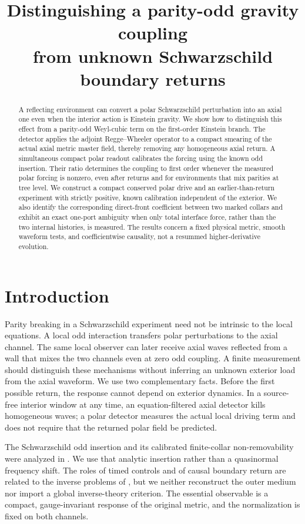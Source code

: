 \documentclass[11pt]{article}
\title{Distinguishing a parity-odd gravity coupling\\from unknown Schwarzschild boundary returns}
\author{}
\date{}
\begin{document}
\maketitle
\begin{abstract}
A reflecting environment can convert a polar Schwarzschild perturbation into an axial one even when the interior action is Einstein gravity. We show how to distinguish this effect from a parity-odd Weyl-cubic term on the first-order Einstein branch. The detector applies the adjoint Regge--Wheeler operator to a compact smearing of the actual axial metric master field, thereby removing any homogeneous axial return. A simultaneous compact polar readout calibrates the forcing using the known odd insertion. Their ratio determines the coupling to first order whenever the measured polar forcing is nonzero, even after returns and for environments that mix parities at tree level. We construct a compact conserved polar drive and an earlier-than-return experiment with strictly positive, known calibration independent of the exterior. We also identify the corresponding direct-front coefficient between two marked collars and exhibit an exact one-port ambiguity when only total interface force, rather than the two internal histories, is measured. The results concern a fixed physical metric, smooth waveform tests, and coefficientwise causality, not a resummed higher-derivative evolution.
\end{abstract}

\section{Introduction}

Parity breaking in a Schwarzschild experiment need not be intrinsic to the local equations. A local odd interaction transfers polar perturbations to the axial channel. The same local observer can later receive axial waves reflected from a wall that mixes the two channels even at zero odd coupling. A finite measurement should distinguish these mechanisms without inferring an unknown exterior load from the axial waveform. We use two complementary facts. Before the first possible return, the response cannot depend on exterior dynamics. In a source-free interior window at any time, an equation-filtered axial detector kills homogeneous waves; a polar detector measures the actual local driving term and does not require that the returned polar field be predicted.

The Schwarzschild odd insertion and its calibrated finite-collar non-removability were analyzed in \cite{P27}. We use that analytic insertion rather than a quasinormal frequency shift. The roles of timed controls and of causal boundary return are related to the inverse problems of \cite{P33,P44}, but we neither reconstruct the outer medium nor import a global inverse-theory criterion. The essential observable is a compact, gauge-invariant response of the original metric, and the normalization is fixed on both channels.
\end{document}
